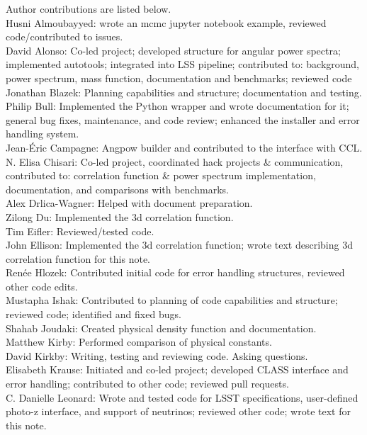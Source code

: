 Author contributions are listed below. \\
Husni Almoubayyed: wrote an mcmc jupyter notebook example, reviewed code/contributed to issues. \\
David Alonso: Co-led project; developed structure for angular power spectra; implemented autotools; integrated into LSS pipeline; contributed to: background, power spectrum, mass function, documentation and benchmarks; reviewed code \\
Jonathan Blazek: Planning capabilities and structure; documentation and testing. \\
Philip Bull: Implemented the Python wrapper and wrote documentation for it; general bug fixes, maintenance, and code review; enhanced the installer and error handling system. \\
Jean-\'Eric Campagne: Angpow builder and contributed to the interface with CCL. \\
N. Elisa Chisari: Co-led project, coordinated hack projects \& communication, contributed to: correlation function \& power spectrum implementation, documentation, and comparisons with benchmarks. \\
Alex Drlica-Wagner: Helped with document preparation. \\
Zilong Du: Implemented the 3d correlation function. \\
Tim Eifler: Reviewed/tested code. \\
John Ellison: Implemented the 3d correlation function; wrote text describing 3d correlation function for this note. \\
Ren\'ee Hlozek: Contributed initial code for error handling structures, reviewed other code edits. \\
Mustapha Ishak: Contributed to planning of code capabilities and structure; reviewed code; identified and fixed bugs. \\
Shahab Joudaki: Created physical density function and documentation. \\
Matthew Kirby: Performed comparison of physical constants. \\
David Kirkby: Writing, testing and reviewing code. Asking questions. \\
Elisabeth Krause: Initiated and co-led project; developed CLASS interface and error handling; contributed to other code; reviewed pull requests. \\
C. Danielle Leonard: Wrote and tested code for LSST specifications, user-defined photo-z interface, and support of neutrinos; reviewed other code; wrote text for this note. \\
